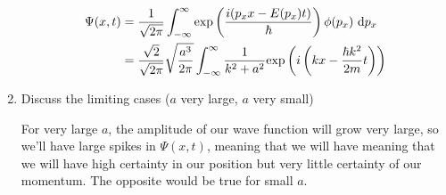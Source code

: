 \documentclass{article}
\begin{document}
\begin{enumerate}[label=(\alph*)]
\begin{solution}
    \begin{align*}
        \Psi(x, t) &= \frac{1}{\sqrt{2 \pi}} \int_{-\infty}^{\infty} \mathrm{exp}\left( \frac{i(p_x x - E(p_x) t)}{\hbar} \right) \phi(p_x) \ \mathrm d p_x\\
        &= \frac{\sqrt 2}{\sqrt{2\pi}} \sqrt{\frac{a^3}{2\pi}} \int_{-\infty}^{\infty} \frac{1}{k^2 + a^2} \mathrm{exp}\left( i\left(kx - \frac{\hbar k^2}{2m}t\right) \right)
    \end{align*}

    
\end{solution}
\item Discuss the limiting cases ($a$ very large, $a$ very small)

\begin{solution}
    For very large $a$, the amplitude of our wave function will grow very large, so we'll have large spikes in $\Psi(x, t)$, meaning that we will have meaning that we will have high certainty in our position but very little certainty of our momentum. The opposite would be true for small $a$.
\end{solution}
\end{enumerate}
\end{document}

